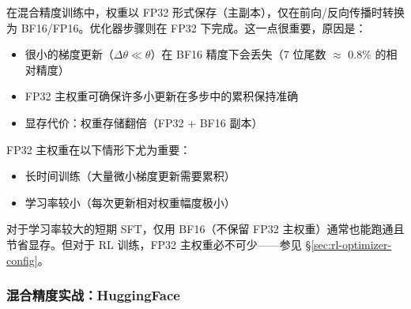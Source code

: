 在混合精度训练中，权重以 FP32 形式保存（主副本），仅在前向/反向传播时转换为 BF16/FP16。优化器步骤则在 FP32 下完成。这一点很重要，原因是：

\begin{itemize}
  \item 很小的梯度更新（$\Delta\theta \ll \theta$）在 BF16 精度下会丢失（7 位尾数 $\approx$ 0.8\% 的相对精度）
  \item FP32 主权重可确保许多小更新在多步中的累积保持准确
  \item 显存代价：权重存储翻倍（FP32 + BF16 副本）
\end{itemize}

\begin{warningbox}[何时 FP32 主权重至关重要]
FP32 主权重在以下情形下尤为重要：

\begin{itemize}
  \item 长时间训练（大量微小梯度更新需要累积）
  \item 学习率较小（每次更新相对权重幅度极小）
\end{itemize}

对于学习率较大的短期 SFT，仅用 BF16（不保留 FP32 主权重）通常也能跑通且节省显存。但对于 RL 训练，FP32 主权重必不可少——参见 §\ref{sec:rl-optimizer-config}。
\end{warningbox}

\subsubsection{混合精度实战：HuggingFace}
\label{mixed-precision-in-practice-huggingface}

